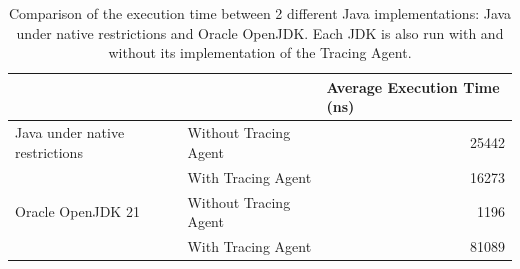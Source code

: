 \begin{table}[]
\centering
\begin{tabular}{@{}llr@{}}
\toprule
                               &                       & \multicolumn{1}{l}{Average Execution Time (ns)} \\ \midrule
Java under native restrictions & Without Tracing Agent & 25442                                           \\
                               & With Tracing Agent    & 16273                                           \\ \midrule
Oracle OpenJDK 21              & Without Tracing Agent & 1196                                            \\
                               & With Tracing Agent    & 81089                                           \\ \bottomrule
\end{tabular}
\caption{Comparison of the execution time between 2 different Java implementations: Java under native restrictions and Oracle OpenJDK. Each JDK is also run with and without its implementation of the Tracing Agent.}
\label{tab:benchmark_1}
\end{table}

